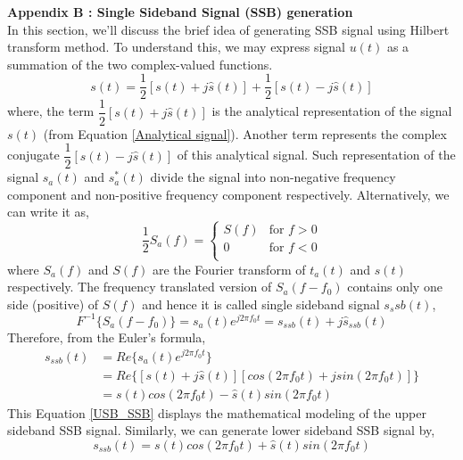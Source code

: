 \textbf{Appendix B : Single Sideband Signal (SSB) generation}\\
In this section, we'll discuss the brief idea of generating SSB signal using Hilbert transform method. To understand this, we may express signal $u(t)$ as a summation of the two complex-valued functions.
\begin{equation}
s(t)=\dfrac{1}{2}[s(t)+j\hat{s}(t)]+\dfrac{1}{2}[s(t)-j\hat{s}(t)]
\label{}
\end{equation}
where, the term $\dfrac{1}{2}[s(t)+j\hat{s}(t)]$ is the analytical representation of the signal $s(t)$ (from Equation \ref{Analytical signal}). Another term represents the complex conjugate $\dfrac{1}{2}[s(t)-j\hat{s}(t)]$ of this analytical signal. Such representation of the signal ${s_a}(t)$ and ${s_a^*}(t)$ divide the signal into non-negative frequency component and non-positive frequency component respectively. Alternatively, we can write it as,
\begin{equation}
\dfrac{1}{2}{S_a}(f) = \begin{cases}
S(f) &\text{for $f>0$}\\
0    &\text{for $f<0$}\\
\end{cases}
\end{equation}
where ${S_a}(f)$ and ${S}(f)$ are the Fourier transform of ${t_a}(t)$ and ${s}(t)$ respectively. The frequency translated version of ${S_a}(f-f_0)$ contains only one side (positive) of ${S}(f)$ and hence it is called single sideband signal ${s_ssb}(t)$,
\begin{equation}
{F}^{-1}\{S_a(f-f_0)\}={s_a}(t) e^{j2\pi f_0 t}={s_{ssb}}(t)+j{\hat{s}_{ssb}(t)}
\end{equation}
Therefore, from the Euler's formula,
\begin{equation}
\begin{split}
{s}_{ssb}(t)&=Re\{s_a(t)  e^{j2\pi f_0 t}\}\\
&=Re\{[s(t)+j\hat{s}(t)] [cos(2\pi f_0t)+jsin(2\pi f_0t)]\}\\
&=s(t)cos(2\pi f_0t)-\hat{s}(t)sin(2\pi f_0t)
\end{split}
\label{USB_SSB}
\end{equation}
This Equation \ref{USB_SSB} displays the mathematical modeling of the upper sideband SSB signal. Similarly, we can generate lower sideband SSB signal by,
\begin{equation}
{s}_{ssb}(t)=s(t)cos(2\pi f_0t)+\hat{s}(t)sin(2\pi f_0t)
\label{LSB_SSB}
\end{equation}\\
